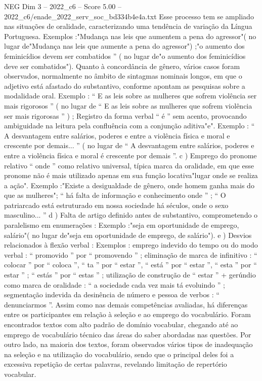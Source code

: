 \begin{textsample}{NEG Dim 3 – 2022\_c6 – Score 5.00 – 2022\_c6/enade\_2022\_serv\_soc\_bd334b4e4a.txt}
Esse processo tem se ampliado nas situações de oralidade, caracterizando uma tendência de variação da Língua Portuguesa.
Exemplos :"Mudança nas leis que aumentem a pena do agressor"( no lugar de"Mudança nas leis que aumente a pena do agressor") ;"o aumento dos feminicídios devem ser combatidos ” ( no lugar de"o aumento dos feminicídios deve ser combatidos").
Quanto à concordância de gênero, vários casos foram observados, normalmente no âmbito de sintagmas nominais longos, em que o adjetivo está afastado do substantivo, conforme apontam as pesquisas sobre a modalidade oral.
Exemplo : “ E as leis sobre as mulheres que sofrem violência ser mais rigorosos ” ( no lugar de “ E as leis sobre as mulheres que sofrem violência ser mais rigorosas ” ) ; Registro da forma verbal “ é ” sem acento, provocando ambiguidade na leitura pela confluência com a conjunção aditiva"e".
Exemplo : “ A desvantagem entre salários, poderes e entre a violência física e moral e crescente por demais... ” ( no lugar de “ A desvantagem entre salários, poderes e entre a violência física e moral é crescente por demais ”. c ) Emprego do pronome relativo “ onde ” como relativo universal, típica marca da oralidade, em que esse pronome não é mais utilizado apenas em sua função locativa"lugar onde se realiza a ação".
Exemplo :"Existe a desigualdade de gênero, onde homem ganha mais do que as mulheres"; “ há falta de informação e conhecimento onde ” ; “ O patriarcado está estruturado em nossa sociedade há séculos, onde o sexo masculino... ” d ) Falta de artigo definido antes de substantivo, comprometendo o paralelismo em enumerações : Exemplo :"seja em oportunidade de emprego, salário"( no lugar de"seja em oportunidade de emprego, de salário"). e ) Desvios relacionados à flexão verbal : Exemplos : emprego indevido do tempo ou do modo verbal : “ promovido ” por “ promovendo ” ; eliminação de marca de infinitivo : “ colocar ” por “ coloca ”, “ ta ” por “ estar ”, “ está ” por “ estar ”, “ esta ” por “ estar ” ; “ estás ” por “ estas ” ; utilização de construção de “ estar ” + gerúndio como marca de oralidade : “ a sociedade cada vez mais tá evoluindo ” ; segmentação indevida da desinência de número e pessoa de verbos : “ denunciarmos ”.
Assim como nas demais competências avaliadas, há diferenças entre os participantes em relação à seleção e ao emprego do vocabulário.
Foram encontrados textos com alto padrão de domínio vocabular, chegando até ao emprego de vocabulário técnico das áreas do saber abordadas nas questões.
Por outro lado, na maioria dos textos, foram observados vários tipos de inadequação na seleção e na utilização do vocabulário, sendo que o principal deles foi a excessiva repetição de certas palavras, revelando limitação de repertório vocabular.

\end{textsample}
